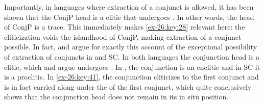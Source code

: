 \documentclass[output=paper]{langsci/langscibook}
\begin{document}
Importantly, in languages where extraction of a conjunct is allowed, it has
been shown that the ConjP head is a clitic that undergoes . In other
words, the head of ConjP is a trace. This immediately makes \eqref{ex-26:key:28} relevant here:
the cliticization voids the islandhood of ConjP, making extraction of a
conjunct possible. In fact, \textcite{Odainpress} and
\textcite{Stjepanovic2014} argue for exactly this account of the exceptional
possibility of extraction of conjuncts in  and \gls{SC}. In both languages
the conjunction head is a clitic, which \citeauthor{Odainpress} and
\citeauthor{Stjepanovic2014} argue undergoes . In , the
conjunction is an enclitic and in \gls{SC} it is a proclitic. In  \eqref{ex-26:key:41},
the conjunction cliticizes to the first conjunct and is in fact carried along
under the  of the first conjunct, which quite conclusively shows that
the conjunction head does not remain in its in situ position.

\ea\label{ex-26:key:41}  \parencite{Odainpress}
    \z
\z
\newpage
\end{document}
